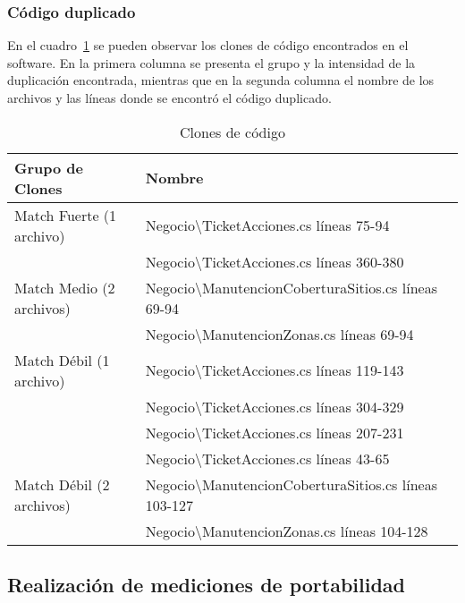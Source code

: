 \subsubsection{Código duplicado}

En el cuadro~\ref{table:clones} se pueden observar los clones de código 
encontrados en el software. En la primera columna se presenta el grupo y la 
intensidad de la duplicación encontrada, mientras que en la segunda columna el
nombre de los archivos y las líneas donde se encontró el código duplicado.

\begin{table}
    \small
\centering

  \begin{tabular}{ | l | l | }
  
  \hline
    \bf{Grupo de Clones} & \bf{Nombre} \\ \hline
    Match Fuerte (1 archivo) & Negocio\textbackslash TicketAcciones.cs líneas 75-94 \\ \hline
     & Negocio\textbackslash TicketAcciones.cs líneas 360-380 \\ \hline
    Match Medio (2 archivos) & Negocio\textbackslash ManutencionCoberturaSitios.cs líneas 69-94 \\ \hline
     & Negocio\textbackslash ManutencionZonas.cs líneas 69-94 \\ \hline
    Match Débil (1 archivo) & Negocio\textbackslash TicketAcciones.cs líneas 119-143 \\ \hline
     & Negocio\textbackslash TicketAcciones.cs líneas 304-329 \\ \hline
     & Negocio\textbackslash TicketAcciones.cs líneas 207-231 \\ \hline
     & Negocio\textbackslash TicketAcciones.cs líneas 43-65 \\ \hline
    Match Débil (2 archivos) & Negocio\textbackslash ManutencionCoberturaSitios.cs líneas 103-127 \\ \hline
     & Negocio\textbackslash ManutencionZonas.cs líneas 104-128 \\ \hline
  \end{tabular}
  \caption{Clones de código}
  \label{table:clones}
\end{table}




\subsection{Realización de mediciones de portabilidad}

